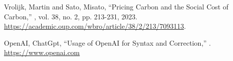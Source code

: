 \begin{thebibliography}{99}

Vrolijk, Martin and Sato, Misato,
\newblock ``Pricing Carbon and the Social Cost of Carbon,''
, vol. 38, no. 2, pp. 213-231, 2023. 
\newblock \url{https://academic.oup.com/wbro/article/38/2/213/7093113}.

OpenAI, ChatGpt,
\newblock ``Usage of OpenAI for Syntax and Correction,''
.
\newblock \url{https://www.openai.com}

\end{thebibliography}